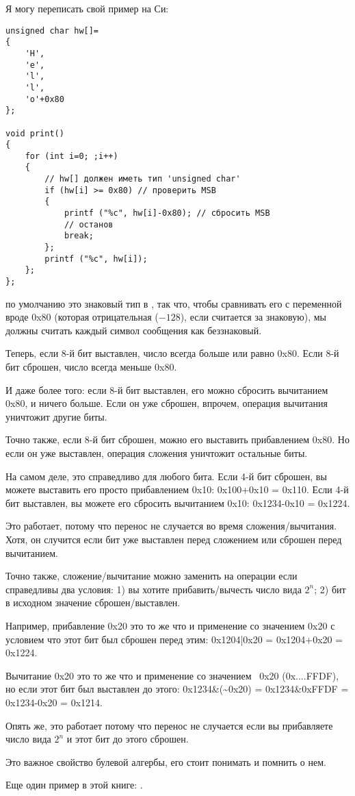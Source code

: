 Я могу переписать свой пример на Си:

\begin{lstlisting}[style=customc]
unsigned char hw[]=
{
	'H',
	'e',
	'l',
	'l',
	'o'+0x80
};

void print()
{
	for (int i=0; ;i++)
	{
		// hw[] должен иметь тип 'unsigned char'
		if (hw[i] >= 0x80) // проверить MSB
		{
			printf ("%c", hw[i]-0x80); // сбросить MSB
			// останов
			break;
		};
		printf ("%c", hw[i]);
	};
};
\end{lstlisting}

 по умолчанию это знаковый тип в \CCpp, так что, чтобы сравнивать его с переменной вроде 0x80 (которая отрицательная
($-128$),
если считается за знаковую),
мы должны считать каждый символ сообщения как беззнаковый.

Теперь, если 8-й бит выставлен, число всегда больше или равно 0x80.
Если 8-й бит сброшен, число всегда меньше 0x80.

И даже более того: если 8-й бит выставлен, его можно сбросить вычитанием 0x80, и ничего больше.
Если он уже сброшен, впрочем, операция вычитания уничтожит другие биты.

Точно также, если 8-й бит сброшен, можно его выставить прибавлением 0x80.
Но если он уже выставлен, операция сложения уничтожит остальные биты.

На самом деле, это справедливо для любого бита.
Если 4-й бит сброшен, вы можете выставить его просто прибавлением 0x10: 0x100+0x10 = 0x110.
Если 4-й бит выставлен, вы можете его сбросить вычитанием 0x10: 0x1234-0x10 = 0x1224.

Это работает, потому что перенос не случается во время сложения/вычитания.
Хотя, он случится если бит уже выставлен перед сложением или сброшен перед вычитанием.

Точно также, сложение/вычитание можно заменить на операции  если справедливы два условия:
1) вы хотите прибавить/вычесть число вида $2^n$;
2) бит в исходном значение сброшен/выставлен.

Например, прибавление 0x20 это то же что и применение  со значением 0x20 с условием что этот бит был сброшен перед
этим:
0x1204|0x20 = 0x1204+0x20 = 0x1224.

Вычитание 0x20 это то же что и применение  со значением ~0x20 (0x....FFDF), но если этот бит был выставлен до этого:
0x1234\&(\~{}0x20) = 0x1234\&0xFFDF = 0x1234-0x20 = 0x1214.

Опять же, это работает потому что перенос не случается если вы прибавляете число вида $2^n$ и этот бит до этого сброшен.

Это важное свойство булевой алгербы, его стоит понимать и помнить о нем.

Еще один пример в этой книге: .


